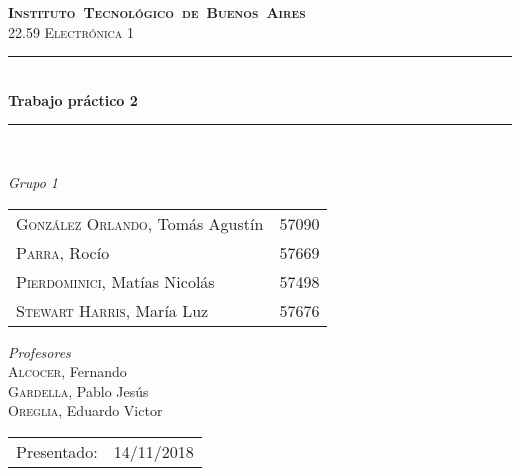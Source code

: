 \begin{titlepage}
\newcommand{\HRule}{\rule{\linewidth}{0.5mm}}
\center
\mbox{\textsc{\LARGE \bfseries {Instituto Tecnol\'ogico de Buenos Aires}}}\\[1.5cm]
\textsc{\Large 22.59 Electr\'onica 1}\\[0.5cm]


\HRule \\[0.6cm]
{ \Huge \bfseries Trabajo pr\'actico 2}\\[0.4cm] %
\HRule \\[1.5cm]


{\large

\emph{Grupo 1}\\
\vspace{3px}

\begin{tabular}{lr} 	
\textsc{Gonz\'alez Orlando}, Tom\'as Agust\'in  & 57090 \\
\textsc{Parra}, Roc\'io  & 57669 \\ 	
\textsc{Pierdominici}, Mat\'ias Nicol\'as & 57498 \\     
\textsc{Stewart Harris}, Mar\'ia Luz  & 57676 	
\end{tabular}

\vspace{20px}

\emph{Profesores}\\
\vspace{3px}
\textsc{Alcocer,} Fernando \\ 	
\textsc{Gardella,} Pablo Jesús\\
\textsc{Oreglia,} Eduardo Victor \\

\vspace{100px}

\begin{tabular}{ll}

Presentado: & 14/11/2018\\

\end{tabular}

}

\vfill

\end{titlepage}
